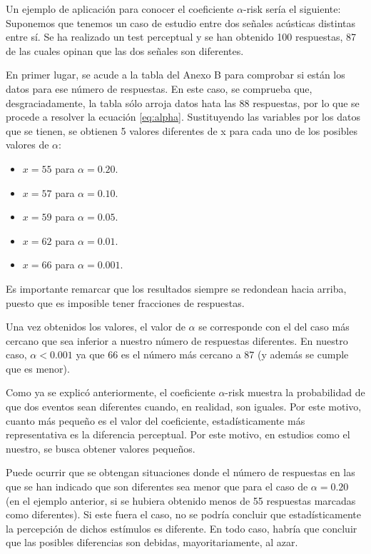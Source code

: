 \documentclass[11pt,a4paper]{book}
\begin{document}
            Un ejemplo de aplicación para conocer el coeficiente $\alpha$-risk sería el siguiente: Suponemos que tenemos un caso de estudio entre dos señales acústicas distintas entre sí.  Se ha realizado un test perceptual y se han obtenido 100 respuestas, 87 de las cuales opinan que las dos señales son diferentes.
            
            En primer lugar, se acude a la tabla del Anexo B para comprobar si están los datos para ese número de respuestas. En este caso, se comprueba que, desgraciadamente, la tabla sólo arroja datos hata las 88 respuestas, por lo que se procede a resolver la ecuación \ref{eq:alpha}. Sustituyendo las variables por los datos que se tienen, se obtienen 5 valores diferentes de x para cada uno de los posibles valores de $\alpha$:
            \begin{itemize}
                \item $x=55$ para $\alpha=0.20$.
                \item $x=57$ para $\alpha=0.10$.
                \item $x=59$ para $\alpha=0.05$.
                \item $x=62$ para $\alpha=0.01$.
                \item $x=66$ para $\alpha=0.001$.
            \end{itemize}
            Es importante remarcar que los resultados siempre se redondean hacia arriba, puesto que es imposible tener fracciones de respuestas.
            
            Una vez obtenidos los valores, el valor de $\alpha$ se corresponde con el del caso más cercano que sea inferior a nuestro número de respuestas diferentes. En nuestro caso, $\alpha<0.001$ ya que 66 es el número más cercano a 87 (y además se cumple que es menor).
            
            Como ya se explicó anteriormente, el coeficiente $\alpha$-risk muestra la probabilidad de que dos eventos sean diferentes cuando, en realidad, son iguales. Por este motivo, cuanto más pequeño es el valor del coeficiente, estadísticamente más representativa es la diferencia perceptual. Por este motivo, en estudios como el nuestro, se busca obtener valores pequeños.
            
            Puede ocurrir que se obtengan situaciones donde el número de respuestas en las que se han indicado que son diferentes sea menor que para el caso de $\alpha=0.20$ (en el ejemplo anterior, si se hubiera obtenido menos de 55 respuestas marcadas como diferentes). Si este fuera el caso, no se podría concluir que estadísticamente la percepción de dichos estímulos es diferente. En todo caso, habría que concluir que las posibles diferencias son debidas, mayoritariamente, al azar. 
            
\end{document}
